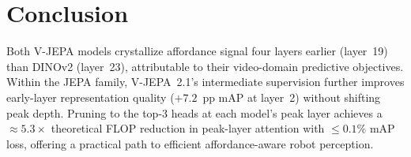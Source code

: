 \section{Conclusion}
\label{sec:conclusion}

Both V-JEPA models crystallize affordance signal four layers earlier (layer~19) than
DINOv2 (layer~23), attributable to their video-domain predictive objectives.
Within the JEPA family, V-JEPA~2.1's intermediate supervision further improves
early-layer representation quality ($+7.2$~pp mAP at layer~2) without shifting peak depth.
Pruning to the top-3 heads at each model's peak layer achieves a ${\approx}5.3{\times}$
theoretical FLOP reduction in peak-layer attention with ${\leq}0.1\%$ mAP loss, offering
a practical path to efficient affordance-aware robot perception.

